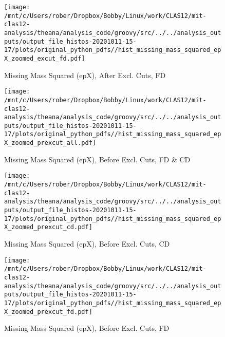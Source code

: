 \documentclass{article}
\begin{document}
\begin{landscape}
    \begin{figure}[h]
        \centering

        \texttt{[image: /mnt/c/Users/rober/Dropbox/Bobby/Linux/work/CLAS12/mit-clas12-analysis/theana/analysis\_code/groovy/src/../../analysis\_outputs/output\_file\_histos-20201011-15-17/plots/original\_python\_pdfs//hist\_missing\_mass\_squared\_epX\_zoomed\_excut\_fd.pdf]}
        \captionsetup{textformat=empty,labelformat=blank}
        \caption{Missing Mass Squared (epX), After Excl. Cuts, FD}
    \end{figure}
    \clearpage
    
    \begin{figure}[h]
        \centering

        \texttt{[image: /mnt/c/Users/rober/Dropbox/Bobby/Linux/work/CLAS12/mit-clas12-analysis/theana/analysis\_code/groovy/src/../../analysis\_outputs/output\_file\_histos-20201011-15-17/plots/original\_python\_pdfs//hist\_missing\_mass\_squared\_epX\_zoomed\_prexcut\_all.pdf]}
        \captionsetup{textformat=empty,labelformat=blank}
        \caption{Missing Mass Squared (epX), Before Excl. Cuts, FD \& CD}
    \end{figure}
    \clearpage
    
    \begin{figure}[h]
        \centering

        \texttt{[image: /mnt/c/Users/rober/Dropbox/Bobby/Linux/work/CLAS12/mit-clas12-analysis/theana/analysis\_code/groovy/src/../../analysis\_outputs/output\_file\_histos-20201011-15-17/plots/original\_python\_pdfs//hist\_missing\_mass\_squared\_epX\_zoomed\_prexcut\_cd.pdf]}
        \captionsetup{textformat=empty,labelformat=blank}
        \caption{Missing Mass Squared (epX), Before Excl. Cuts, CD}
    \end{figure}
    \clearpage
    
    \begin{figure}[h]
        \centering

        \texttt{[image: /mnt/c/Users/rober/Dropbox/Bobby/Linux/work/CLAS12/mit-clas12-analysis/theana/analysis\_code/groovy/src/../../analysis\_outputs/output\_file\_histos-20201011-15-17/plots/original\_python\_pdfs//hist\_missing\_mass\_squared\_epX\_zoomed\_prexcut\_fd.pdf]}
        \captionsetup{textformat=empty,labelformat=blank}
        \caption{Missing Mass Squared (epX), Before Excl. Cuts, FD}
    \end{figure}
    \clearpage
    
    \begin{figure}[h]
        \centering


\end{figure}
\end{landscape}
\end{document}
